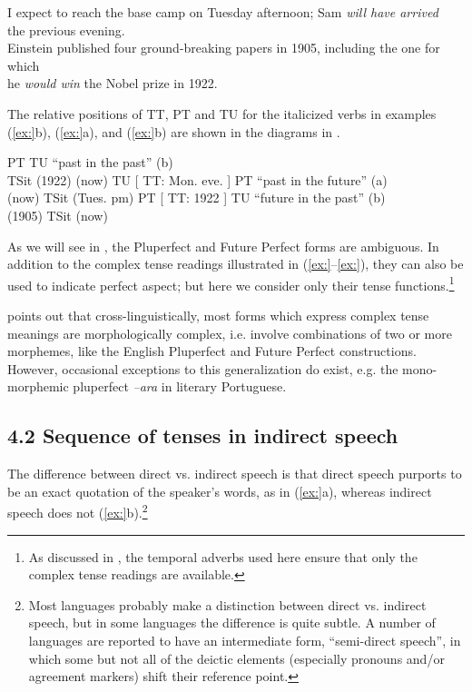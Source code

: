 \ea
\ea I expect to reach the base camp on Tuesday afternoon; Sam \textit{will have arrived} \\
  the previous evening.\\
\ex Einstein published four ground-breaking papers in 1905, including the one for which\\
  he \textit{would win} the Nobel prize in 1922.
                       \z
\z


The relative positions of TT, PT and TU for the italicized verbs in examples (\ref{ex:}b), (\ref{ex:}a), and (\ref{ex:}b) are shown in the diagrams in .


\ea
\ea      [  TT: 1905  ]  PT  TU   “past in the past” (b)\\
         \textbf{{\textbar}}TSit\textbf{{\textbar}}    (1922)  (now)
\ex    TU  [  TT: Mon. eve.  ]  PT  “past in the future” (a)\\
  (now)      \textbf{{\textbar}}TSit\textbf{{\textbar}}    (Tues. pm)
\ex    PT  [  TT: 1922  ]  TU  “future in the past” (b)\\
  (1905)      \textbf{{\textbar}}TSit\textbf{{\textbar}}   (now)
\z \z


As we will see in , the Pluperfect and Future Perfect forms are ambiguous. In addition to the complex tense readings illustrated in (\ref{ex:}--\ref{ex:}), they can also be used to indicate perfect aspect; but here we consider only their tense functions.\footnote{As discussed in , the temporal adverbs used here ensure that only the complex tense readings are available.}



\citet{Comrie1985} points out that cross-linguistically, most forms which express complex tense meanings are morphologically complex, i.e. involve combinations of two or more morphemes, like the English Pluperfect and Future Perfect constructions. However, occasional exceptions to this generalization do exist, e.g. the mono-morphemic pluperfect \textit{–ara} in literary Portuguese.


\subsection{4.2 Sequence of tenses in indirect speech}\label{sec:}

The difference between direct vs. indirect speech is that direct speech purports to be an exact quotation of the speaker’s words, as in (\ref{ex:}a), whereas indirect speech does not (\ref{ex:}b).\footnote{Most languages probably make a distinction between direct vs. indirect speech, but in some languages the difference is quite subtle. A number of languages are reported to have an intermediate form, “semi-direct speech”, in which some but not all of the deictic elements (especially pronouns and/or agreement markers) shift their reference point.}


